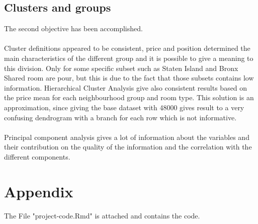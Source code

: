 \documentclass{FR16}
\begin{document}
\subsection{Clusters and groups}
The second objective has been accomplished.\\\\ Cluster definitions appeared to be consistent, price and position determined the main characteristics of the different group and it is possible to give a meaning to this division. Only for some specific subset such as Staten Island and Bronx Shared room are pour, but this is due to the fact that those subsets contains low information.
Hierarchical Cluster Analysis give also consistent results based on the price mean for each neighbourhood group and room type. This solution is an approximation, since giving the base dataset with 48000 gives result to a very confusing dendrogram  with a branch for each row which is not informative.
\\\\
Principal component analysis gives a lot of information about the variables and their contribution on the quality of the information and the correlation with the different components.



\newpage
\section{Appendix}
%
The File "project-code.Rmd" is attached and contains the code.

%
\end{document}
